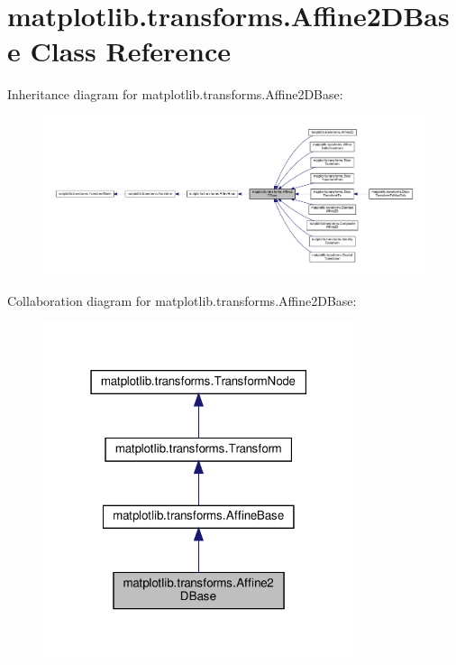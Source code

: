 \hypertarget{classmatplotlib_1_1transforms_1_1Affine2DBase}{}\section{matplotlib.\+transforms.\+Affine2\+D\+Base Class Reference}
\label{classmatplotlib_1_1transforms_1_1Affine2DBase}


Inheritance diagram for matplotlib.\+transforms.\+Affine2\+D\+Base\+:
\nopagebreak
\begin{figure}[H]
\begin{center}
\leavevmode
\includegraphics[width=350pt]{classmatplotlib_1_1transforms_1_1Affine2DBase__inherit__graph}
\end{center}
\end{figure}


Collaboration diagram for matplotlib.\+transforms.\+Affine2\+D\+Base\+:
\nopagebreak
\begin{figure}[H]
\begin{center}
\leavevmode
\includegraphics[width=259pt]{classmatplotlib_1_1transforms_1_1Affine2DBase__coll__graph}
\end{center}
\end{figure}
